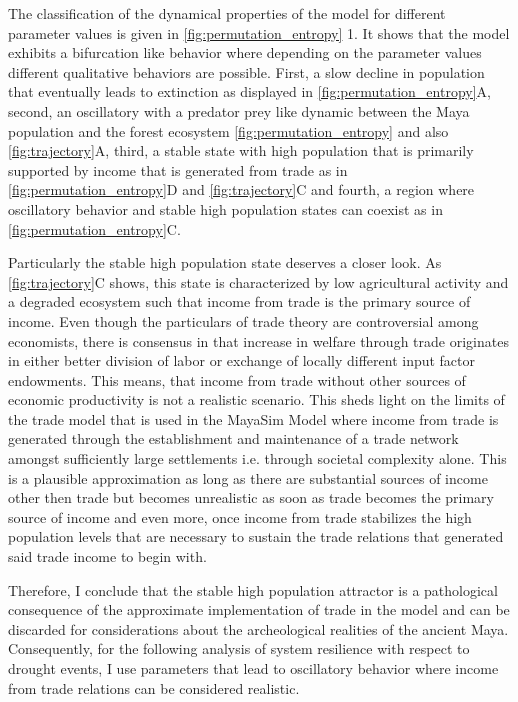 The classification of the dynamical properties of the model for different parameter values is given in \cref{fig:permutation_entropy} 1. It shows that the model exhibits a bifurcation like behavior where depending on the parameter values different qualitative behaviors are possible. First, a slow decline in population that eventually leads to extinction as displayed in \cref{fig:permutation_entropy}A, second, an oscillatory with a predator prey like dynamic between the Maya population and the forest ecosystem \cref{fig:permutation_entropy} and also \cref{fig:trajectory}A, third, a stable state with high population that is primarily supported by income that is generated from trade as in \cref{fig:permutation_entropy}D and \cref{fig:trajectory}C and fourth, a region where oscillatory behavior and stable high population states can coexist as in \cref{fig:permutation_entropy}C.


Particularly the stable high population state deserves a closer look. As \cref{fig:trajectory}C shows, this state is characterized by low agricultural activity and a degraded ecosystem such that income from trade is the primary source of income. Even though the particulars of trade theory are controversial among economists, there is consensus in that increase in welfare through trade originates in either better division of labor or exchange of locally different input factor endowments. This means, that income from trade without other sources of economic productivity is not a realistic scenario. This sheds light on the limits of the trade model that is used in the MayaSim Model where income from trade is generated through the establishment and maintenance of a trade network amongst sufficiently large settlements i.e. through societal complexity alone. This is a plausible approximation as long as there are substantial sources of income other then trade but becomes unrealistic as soon as trade becomes the primary source of income and even more, once income from trade stabilizes the high population levels that are necessary to sustain the trade relations that generated said trade income to begin with.

Therefore, I conclude that the stable high population attractor is a pathological consequence of the approximate implementation of trade in the model and can be discarded for considerations about the archeological realities of the ancient Maya.
Consequently, for the following analysis of system resilience with respect to drought events, I use parameters that lead to oscillatory behavior where income from trade relations can be considered realistic.

